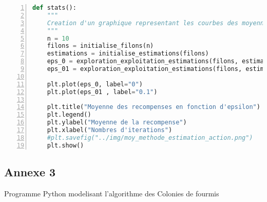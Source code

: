 \documentclass[
12pt,
french,
]{article}
\begin{document}
\begin{lstlisting}[language=Python, numbers=left, label=exploration_exploitation_estimations]
def stats():
    """
    Creation d'un graphique representant les courbes des moyennes des recompenses
    """
    n = 10
    filons = initialise_filons(n)
    estimations = initialise_estimations(filons)
    eps_0 = exploration_exploitation_estimations(filons, estimations, 0)
    eps_01 = exploration_exploitation_estimations(filons, estimations, 0.1)

    plt.plot(eps_0, label="0")
    plt.plot(eps_01 , label="0.1")

    plt.title("Moyenne des recompenses en fonction d'epsilon")
    plt.legend()
    plt.ylabel("Moyenne de la recompense")
    plt.xlabel("Nombres d'iterations")
    #plt.savefig("../img/moy_methode_estimation_action.png")
    plt.show()
\end{lstlisting}

\hypertarget{annexe-3}{%
\subsection{Annexe 3}\label{annexe-3}}

Programme Python modelisant l'algorithme des Colonies de fourmis
\end{document}
